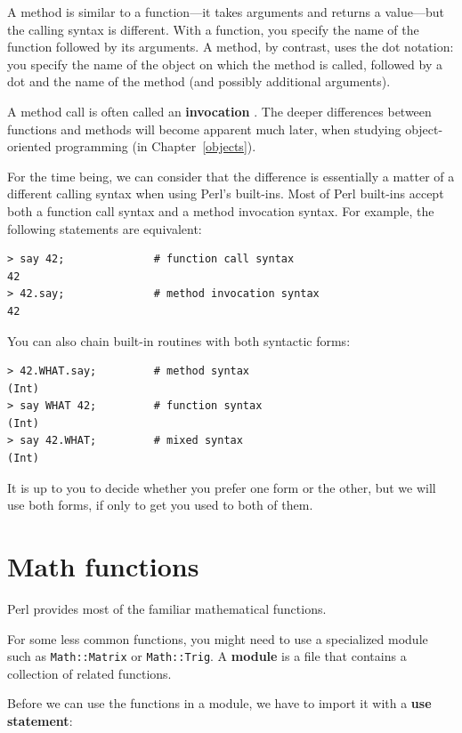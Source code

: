 A method is similar to a function---it takes arguments and
returns a value---but the calling syntax is different. With 
a function, you specify the name of the function followed 
by its arguments. A method, by contrast, uses the dot 
notation: you specify the name of the object on which 
the method is called, followed by a dot and the name of 
the method (and possibly additional arguments).

A method call is often called an {\bf invocation}
. The deeper differences between functions and
methods will become apparent much later, when studying 
object-oriented programming (in Chapter~\ref{objects}).

For the time being, we can consider that the difference is 
essentially a matter of a different calling syntax when using Perl's 
built-ins. Most of Perl built-ins accept both a function 
call syntax and a method invocation syntax. For example, 
the following statements are equivalent:

\begin{verbatim}
> say 42;              # function call syntax
42
> 42.say;              # method invocation syntax
42
\end{verbatim}
%

You can also chain built-in routines with both syntactic 
forms:

\begin{verbatim}
> 42.WHAT.say;         # method syntax
(Int)
> say WHAT 42;         # function syntax
(Int)
> say 42.WHAT;         # mixed syntax
(Int)
\end{verbatim}
%

It is up to you to decide whether you prefer one form or the 
other, but we will use both forms, if only to get you used to 
both of them.

\section{Math functions}

Perl provides most of the familiar mathematical functions.

For some less common functions, you might need to use a 
specialized module such as \verb'Math::Matrix' or 
\verb'Math::Trig'.  A {\bf module} is a file that contains a
collection of related functions.

Before we can use the functions in a module, we have to import it with
a {\bf use statement}:

